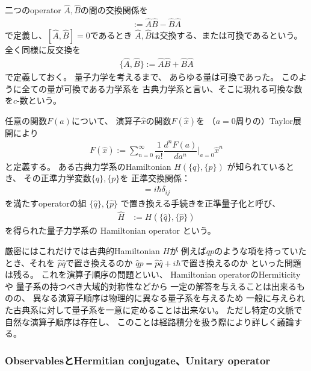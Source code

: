 二つのoperator $\hat{A}, \hat{B}$の間の交換関係を
\begin{align}
    [\hat{A}, \hat{B}] := \hat{A} \hat{B} - \hat{B} \hat{A}
\end{align}
で定義し、$[\hat{A}, \hat{B}] = 0$であるとき
$\hat{A}, \hat{B}$は交換する、または可換であるという。
全く同様に反交換を
\begin{align}
    \{\hat{A}, \hat{B}\} := \hat{A} \hat{B} + \hat{B} \hat{A}
\end{align}
で定義しておく。
量子力学を考えるまで、
あらゆる量は可換であった。
このように全ての量が可換である力学系を
古典力学系と言い、そこに現れる可換な数を$c$-数という。

任意の関数$F(a)$について、
演算子$\hat{x}$の関数$F(\hat{x})$を
（$a=0$周りの）Taylor展開により
\begin{align}
    F(\hat{x}) := \sum_{n=0}^\infty
        \dfrac{1}{n!}
        \dfrac{d^nF(a)}{da^n}\bigg|_{a=0}
        \hat{x}^n
\label{function of operator}
\end{align}
と定義する。
ある古典力学系のHamiltonian $H(\{q\},\{p\})$
が知られているとき、
その正準力学変数$\{q\},\{p\}$を
正準交換関係：
\begin{align}
    [ \hat{q}_i , \hat{p}_j ] = i\hbar \delta_{ij}
\end{align}
を満たすoperatorの組
$ \{\hat{q}\} , \{\hat{p}\} $
で置き換える手続きを正準量子化と呼び、
\begin{align}
    \hat{H}
    &:=
    H(\{\hat{q}\} , \{\hat{p}\})
\end{align}
を得られた量子力学系の
Hamiltonian operator
という。

厳密にはこれだけでは古典的Hamiltonian $H$が
例えば$qp$のような項を持っていたとき、それを
$\hat{p}\hat{q}$で置き換えるのか
$\hat{q}\hat{p} = \hat{p}\hat{q} + i\hbar$で置き換えるのか
といった問題は残る。
これを演算子順序の問題といい、
Hamiltonian operatorのHermiticityや
量子系の持つべき大域的対称性などから
一定の解答を与えることは出来るものの、
異なる演算子順序は物理的に異なる量子系を与えるため
一般に与えられた古典系に対して量子系を一意に定めることは出来ない。
ただし特定の文脈で自然な演算子順序は存在し、
このことは経路積分を扱う際により詳しく議論する。

\subsubsection{ObservablesとHermitian conjugate、Unitary operator}

